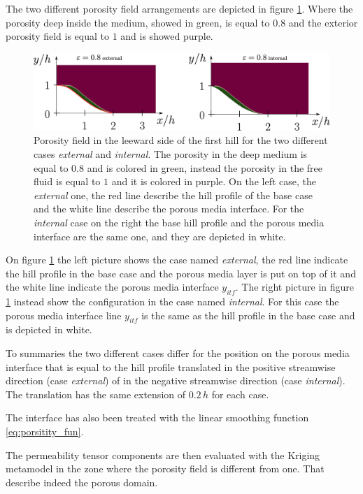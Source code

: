 The two different porosity field arrangements are depicted in figure \ref{fig:por_gauss}. Where the porosity deep inside the medium, showed in green, is equal to $0.8$ and the exterior porosity field is equal to $1$ and is showed purple.

\begin{figure}[h]
	\centering
	\includegraphics[width=1\linewidth]{chapter_5/figure/por}
	\caption{Porosity field in the leeward side of the first hill for the two different cases \textit{external} and \textit{internal}. The porosity in the deep medium is equal to $0.8$ and is colored in green, instead the porosity in the free fluid is equal to $1$ and it is colored in purple. On the left case, the \textit{external} one, the red line describe the hill profile of the base case and the white line describe the porous media interface. For the \textit{internal} case on the right the base hill profile and the porous media interface are the same one, and they are depicted in white.}
	\label{fig:por_gauss}
\end{figure}

On figure \ref{fig:por_gauss} the left picture shows the case named \textit{external}, the red line indicate the hill profile in the base case and the porous media layer is put on top of it and the white line indicate the porous media interface $y_{itf}$.
The right picture in figure \ref{fig:por_gauss} instead show the configuration in the case named \textit{internal}. For this case the porous media interface line $y_{itf}$ is the same as the hill profile in the base case and is depicted in white.

To summaries the two different cases differ for the position on the porous media interface that is equal to the hill profile translated in the positive streamwise direction (case \textit{external}) of in the negative streamwise direction (case \textit{internal}). The translation has the same extension of $0.2\,h$ for each case.

The interface has also been treated with the linear smoothing function \eqref{eq:porsitity_fun}.

The permeability tensor components are then evaluated with the Kriging metamodel in the zone where the porosity field is different from one. That describe indeed the porous domain.


